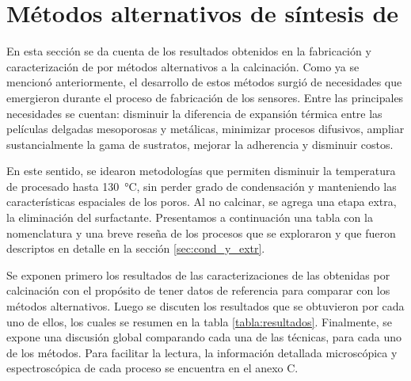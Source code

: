 \section{Métodos alternativos de síntesis de \pdm}
	
	 	 En esta sección se da cuenta de los resultados obtenidos en la fabricación y caracterización de \pdm\space por métodos alternativos a la calcinación. Como ya se mencionó anteriormente, el desarrollo de estos métodos surgió de necesidades que emergieron durante el proceso de fabricación de los sensores. Entre las principales necesidades se cuentan: disminuir la diferencia de expansión térmica entre las películas delgadas mesoporosas y metálicas, minimizar procesos difusivos, ampliar sustancialmente la gama de sustratos, mejorar la adherencia y disminuir costos.

		 En este sentido, se idearon metodologías que permiten disminuir la temperatura de procesado hasta \SI{130}{\celsius}, sin perder grado de condensación y manteniendo las características espaciales de los poros. Al no calcinar, se agrega una etapa extra, la eliminación del surfactante. Presentamos a continuación una tabla con la nomenclatura y una breve reseña de los procesos que se exploraron y que fueron descriptos en detalle en la sección \ref{sec:cond_y_extr}.

		 Se exponen primero los resultados de las caracterizaciones de las \pdm\space obtenidas por calcinación con el propósito de tener datos de referencia para comparar con los métodos alternativos. Luego se discuten los resultados que se obtuvieron por cada uno de ellos, los cuales se resumen en la tabla \ref{tabla:resultados}. Finalmente, se expone una discusión global comparando cada una de las técnicas, para cada uno de los métodos. Para facilitar la lectura, la información detallada microscópica y espectroscópica de cada proceso se encuentra en el anexo C.
	 
